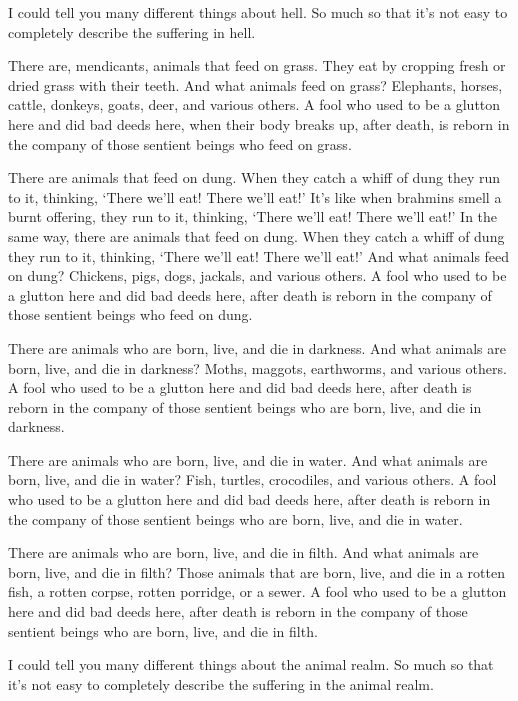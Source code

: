 \documentclass[12pt,openany]{book}%
\begin{document}
I could tell you many different things about hell. So much so that it’s not easy to completely describe the suffering in hell. 

There are, mendicants, animals that feed on grass. They eat by cropping fresh or dried grass with their teeth. And what animals feed on grass? Elephants, horses, cattle, donkeys, goats, deer, and various others. A fool who used to be a glutton here and did bad deeds here, when their body breaks up, after death, is reborn in the company of those sentient beings who feed on grass. 

There are animals that feed on dung. When they catch a whiff of dung they run to it, thinking, ‘There we’ll eat! There we’ll eat!’ It’s like when brahmins smell a burnt offering, they run to it, thinking, ‘There we’ll eat! There we’ll eat!’ In the same way, there are animals that feed on dung. When they catch a whiff of dung they run to it, thinking, ‘There we’ll eat! There we’ll eat!’ And what animals feed on dung? Chickens, pigs, dogs, jackals, and various others. A fool who used to be a glutton here and did bad deeds here, after death is reborn in the company of those sentient beings who feed on dung. 

There are animals who are born, live, and die in darkness. And what animals are born, live, and die in darkness? Moths, maggots, earthworms, and various others. A fool who used to be a glutton here and did bad deeds here, after death is reborn in the company of those sentient beings who are born, live, and die in darkness. 

There are animals who are born, live, and die in water. And what animals are born, live, and die in water? Fish, turtles, crocodiles, and various others. A fool who used to be a glutton here and did bad deeds here, after death is reborn in the company of those sentient beings who are born, live, and die in water. 

There are animals who are born, live, and die in filth. And what animals are born, live, and die in filth? Those animals that are born, live, and die in a rotten fish, a rotten corpse, rotten porridge, or a sewer. A fool who used to be a glutton here and did bad deeds here, after death is reborn in the company of those sentient beings who are born, live, and die in filth. 

I could tell you many different things about the animal realm. So much so that it’s not easy to completely describe the suffering in the animal realm. 
\end{document}
